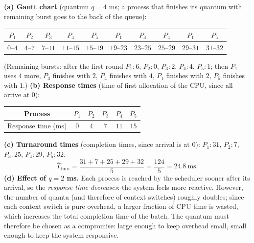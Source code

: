 \documentclass[11pt]{article}
\newcommand{\cle}[1]{{\popxbold\color{popdark}#1}}
\begin{document}
\begin{corrige}
\textbf{(a) Gantt chart} (quantum $q=4$ ms; a process that finishes its quantum with remaining burst goes to the back of the queue):
\begin{center}
\begin{tabular}{|c|c|c|c|c|c|c|c|c|c|}
\hline
\rowcolor{popblueL} $P_1$ & $P_2$ & $P_3$ & $P_4$ & $P_5$ & $P_1$ & $P_3$ & $P_4$ & $P_1$ & $P_5$ \\
\hline
$0$--$4$ & $4$--$7$ & $7$--$11$ & $11$--$15$ & $15$--$19$ & $19$--$23$ & $23$--$25$ & $25$--$29$ & $29$--$31$ & $31$--$32$ \\
\hline
\end{tabular}
\end{center}
(Remaining bursts: after the first round $P_1\!:6$, $P_2\!:0$, $P_3\!:2$, $P_4\!:4$, $P_5\!:1$; then $P_1$ uses $4$ more, $P_3$ finishes with $2$, $P_4$ finishes with $4$, $P_1$ finishes with $2$, $P_5$ finishes with $1$.)
\textbf{(b) Response times} (time of first allocation of the CPU, since all arrive at $0$):
\begin{center}
\begin{tabular}{|c|c|c|c|c|c|}
\hline
\rowcolor{popblueL} Process & $P_1$ & $P_2$ & $P_3$ & $P_4$ & $P_5$ \\
\hline
Response time (ms) & $0$ & $4$ & $7$ & $11$ & $15$ \\
\hline
\end{tabular}
\end{center}
\textbf{(c) Turnaround times} (completion times, since arrival is at $0$): $P_1\!:31$, $P_2\!:7$, $P_3\!:25$, $P_4\!:29$, $P_5\!:32$.
\[ \bar{T}_{\text{turn}} = \frac{31+7+25+29+32}{5} = \frac{124}{5} = 24.8\ \text{ms}. \]
\textbf{(d) Effect of $q=2$ ms.} Each process is reached by the scheduler sooner after its arrival, so the \emph{response time decreases}: the system feels more reactive. However, the number of quanta (and therefore of \cle{context switches}) roughly doubles; since each context switch is pure overhead, a larger fraction of CPU time is wasted, which increases the total completion time of the batch. The quantum must therefore be chosen as a compromise: large enough to keep overhead small, small enough to keep the system responsive.
\end{corrige}
\end{document}
